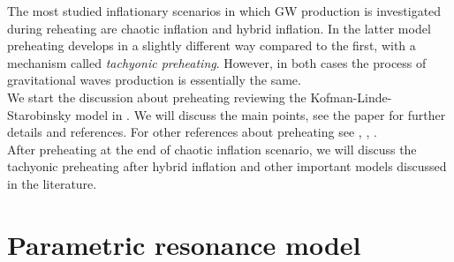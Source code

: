 \documentclass[11pt,a4paper,twoside]{book}
\begin{document}
The most studied inflationary scenarios in which GW production is investigated during reheating are chaotic inflation and hybrid inflation. In the latter model preheating develops in a slightly different way compared to the first, with a mechanism called \textit{tachyonic preheating}. However, in both cases the process of gravitational waves production is essentially the same.\\
We start the discussion about preheating reviewing the Kofman-Linde-Starobinsky model in \cite{Chap4:LindePreheatingModel}. We will discuss the main points, see the paper for further details and references. For other references about preheating see \cite{Chap4:Lozanov}, \cite{Chap4:AminHetrzberg}, \cite{InflationDynamicsAndReheating:chap1}.\\
After preheating at the end of chaotic inflation scenario, we will discuss the tachyonic preheating after hybrid inflation and other important models discussed in the literature.

\section{Parametric resonance model}
\end{document}
